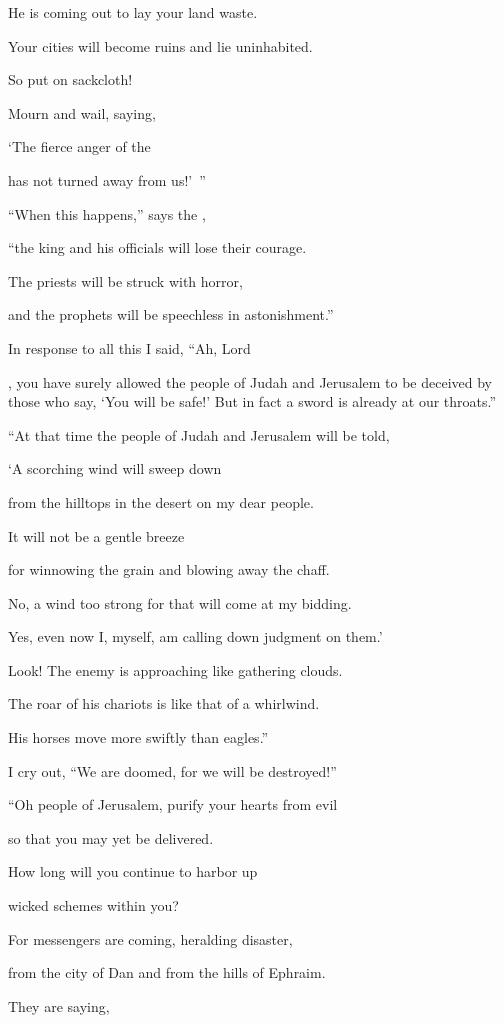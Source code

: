 {\par }{\Q He is coming out to lay
your land
waste.
\par }{\Q Your cities
will become ruins
and lie uninhabited.
\par }{\Q {}So put
on
sackcloth!
\par }{\Q Mourn
and wail,
saying,
\par }{\Q ‘The fierce
anger
of the {}
\par }{\Q has not
turned
away from us!’ ”
\par }{\Q {}“When
this
happens,”
says
the {},
\par }{\Q “the king
and his officials
will lose
their courage.
\par }{\Q The priests
will be struck with horror,
\par }{\Q and the prophets
will be speechless in astonishment.”
\par }{\PP {}In response to all this I said,
“Ah,
Lord

{}, you have surely
allowed
the people
of Judah and Jerusalem
to be deceived by those who
say,
‘You will be safe!’ But in fact
a sword
is already at our throats.”
\par }{\Q {}“At that time
the people
of Judah and Jerusalem
will be told,
\par }{\Q ‘A scorching
wind
will sweep down
\par }{\Q from the hilltops
in the desert
on
my dear
people.
\par }{\Q It will
not
be
a gentle
breeze
\par }{\Q for winnowing
the grain
and blowing away
the chaff.
\par }{\Q {}No, a wind
too strong
for that will come
at my bidding.
\par }{\Q Yes, even
now
I,
myself, am calling down
judgment on them.’
\par }{\Q {}Look! The enemy is approaching
like gathering
clouds.

\par }{\Q The roar of his chariots
is like that of a whirlwind.
\par }{\Q His horses
move more swiftly
than eagles.”
\par }{\Q I cry out, “We are doomed,
for
we will be destroyed!”
\par }{\Q {}“Oh people of Jerusalem,
purify
your hearts
from evil
\par }{\Q so that you may
yet be delivered.
\par }{\Q How long
will you continue
to harbor up
\par }{\Q wicked schemes
within you?
\par }{\Q {}For
messengers are coming, heralding
disaster,
\par }{\Q from the city of Dan
and from the hills
of Ephraim.
\par }{\Q {}They are saying,

}
